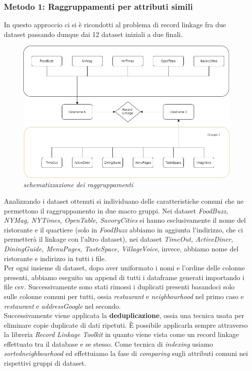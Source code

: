 \documentclass[a4paper,12pt]{article}
\begin{document}
\subsubsection{Metodo 1: Raggruppamenti per attributi simili}
In questo approccio ci si è ricondotti al problema di record linkage fra due dataset passando dunque dai 12 dataset iniziali a due finali. \\

\begin{figure}[H]
	\centering
	\includegraphics[width=0.9\linewidth]{img/diagramMethod.png}
	\caption{\textit{schematizzazione dei raggruppamenti}}
\end{figure}


\noindent Analizzando i dataset ottenuti si individuano delle caratteristiche comuni che ne permettono il raggruppamento in due macro gruppi.
Nei dataset \textit{FoodBuzz, NYMag, NYTimes, OpenTable, SavoryCities} si hanno esclusivamente il nome del ristorante e il quartiere (solo in \textit{FoodBuzz} abbiamo in aggiunta l'indirizzo, che ci permetterà il linkage con l'altro dataset), nei dataset \textit{TimeOut, ActiveDiner, DiningGuide, MenuPages, TasteSpace, VillageVoice}, invece, abbiamo nome del ristorante e indirizzo in tutti i file. \\

\noindent Per ogni insieme di dataset, dopo aver uniformato i nomi e l'ordine delle colonne presenti, abbiamo eseguito un append di tutti i dataframe generati importando i file csv. 
Successivamente sono stati rimossi i duplicati presenti basandoci solo sulle colonne comuni per tutti, ossia \textit{restaurant} e \textit{neighbourhood} nel primo caso e \textit{restaurant} e \textit{addressGoogle} nel secondo. \\

\noindent Successivamente viene applicata la \textbf{deduplicazione}, ossia una tecnica usata per eliminare copie duplicate di dati ripetuti. È possibile applicarla sempre attraverso la libreria \textit{Record Linkage Toolkit} in quanto viene vista come un record linkage effettuato tra il database e se stesso. Come tecnica di \textit{indexing} usiamo \textit{sortedneighbourhood} ed effettuiamo la fase di \textit{comparing} sugli attributi comuni nei rispettivi gruppi di dataset. \\
\end{document}
